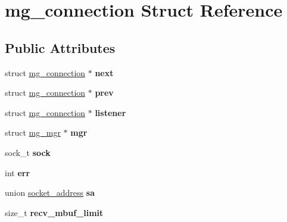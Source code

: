 \hypertarget{structmg__connection}{}\section{mg\+\_\+connection Struct Reference}
\label{structmg__connection}
\subsection*{Public Attributes}
\begin{DoxyCompactItemize}
\item 
struct \hyperlink{structmg__connection}{mg\+\_\+connection} $\ast$ {\bfseries next}\hypertarget{structmg__connection_afcfd89f119a87cba6f6dfec2d2eda5d9}{}\label{structmg__connection_afcfd89f119a87cba6f6dfec2d2eda5d9}

\item 
struct \hyperlink{structmg__connection}{mg\+\_\+connection} $\ast$ {\bfseries prev}\hypertarget{structmg__connection_aa93fd5ca83f11230bc971a68a7fa8d5e}{}\label{structmg__connection_aa93fd5ca83f11230bc971a68a7fa8d5e}

\item 
struct \hyperlink{structmg__connection}{mg\+\_\+connection} $\ast$ {\bfseries listener}\hypertarget{structmg__connection_a9392bec67d0dc8df58e6c171214ddf8d}{}\label{structmg__connection_a9392bec67d0dc8df58e6c171214ddf8d}

\item 
struct \hyperlink{structmg__mgr}{mg\+\_\+mgr} $\ast$ {\bfseries mgr}\hypertarget{structmg__connection_ac341f1f2bd18e030fe90a914e4517506}{}\label{structmg__connection_ac341f1f2bd18e030fe90a914e4517506}

\item 
sock\+\_\+t {\bfseries sock}\hypertarget{structmg__connection_a608f2461b3dd53e503d6ed3c84ec55b0}{}\label{structmg__connection_a608f2461b3dd53e503d6ed3c84ec55b0}

\item 
int {\bfseries err}\hypertarget{structmg__connection_aa13a0bd4a2ce3d6384866acb7e00344a}{}\label{structmg__connection_aa13a0bd4a2ce3d6384866acb7e00344a}

\item 
union \hyperlink{unionsocket__address}{socket\+\_\+address} {\bfseries sa}\hypertarget{structmg__connection_a3dfa1816f5a4b0725d9d04be75bbb3f8}{}\label{structmg__connection_a3dfa1816f5a4b0725d9d04be75bbb3f8}

\item 
size\+\_\+t {\bfseries recv\+\_\+mbuf\+\_\+limit}\hypertarget{structmg__connection_ab15e90e7fb7b8719cc7dcc67f45856e1}{}\label{structmg__connection_ab15e90e7fb7b8719cc7dcc67f45856e1}


\end{DoxyCompactItemize}

